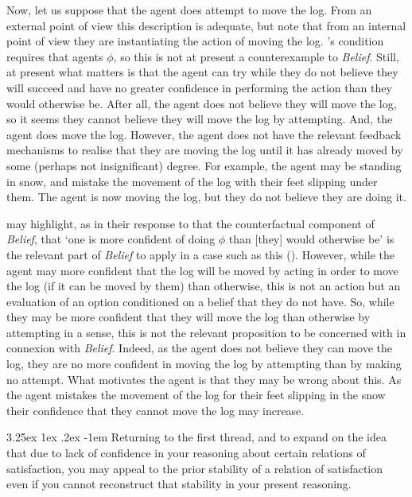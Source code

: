 \documentclass[10pt]{article}
\makeatletter
\renewcommand\paragraph{\@startsection{paragraph}{5}{\z@}%
  {3.25ex \@plus1ex \@minus.2ex}%
  {-1em}%
  {\normalfont\normalsize\bfseries}}
\makeatother
\begin{document}
{Now, let us suppose that the agent does attempt to move the log.
From an external point of view this description is adequate, but note that from an internal point of view they are instantiating the action of moving the log.
\citeauthor{Setiya:2008aa}'s condition requires that agents \(\phi\), so this is not at present a counterexample to \emph{Belief}.
Still, at present what matters is that the agent can try while they do not believe they will succeed and have no greater confidence in performing the action than they would otherwise be.
After all, the agent does not believe they will move the log, so it seems they cannot believe they will move the log by attempting.
And, the agent does move the log.
However, the agent does not have the relevant feedback mechanisms to realise that they are moving the log until it has already moved by some (perhaps not insignificant) degree.
For example, the agent may be standing in snow, and mistake the movement of the log with their feet slipping under them.
The agent is now moving the log, but they do not believe they are doing it.

\citeauthor{Setiya:2009aa} may highlight, as in their response to \textcite{Paul:2009aa} that the counterfactual component of \emph{Belief}, that `one is more confident of doing \(\phi\) than [they] would otherwise be' is the relevant part of \emph{Belief} to apply in a case such as this (\citeyear[131]{Setiya:2009aa}).
However, while the agent may more confident that the log will be moved by acting in order to move the log (if it can be moved by them) than otherwise, this is not an action but an evaluation of an option conditioned on a belief that they do not have.
So, while they may be more confident that they will move the log than otherwise by attempting in a sense, this is not the relevant proposition to be concerned with in connexion with \emph{Belief}.
Indeed, as the agent does not believe they can move the log, they are no more confident in moving the log by attempting than by making no attempt.
What motivates the agent is that they may be wrong about this.
As the agent mistakes the movement of the log for their feet slipping in the snow their confidence that they cannot move the log may increase.
}


\paragraph{ } %
Returning to the first thread, and to expand on the idea that due to lack of confidence in your reasoning about certain relations of satisfaction, you may appeal to the prior stability of a relation of satisfaction even if you cannot reconstruct that stability in your present reasoning.
\end{document}
